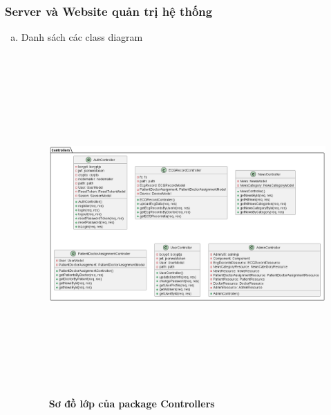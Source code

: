 \subsubsection{Server và Website quản trị hệ thống}


\begin{enumerate}[a)]
\item Danh sách các class diagram

\begin{figure}[H]
  \centering
  \includegraphics[width=16cm,height=13cm]{Images/server/class/class_controller.png}
  \caption[Sơ đồ lớp của package Controllers]{\bfseries \fontsize{12pt}{0pt}\selectfont Sơ đồ lớp của package Controllers}
  \label{class_controller} %
\end{figure}




\end{enumerate}
